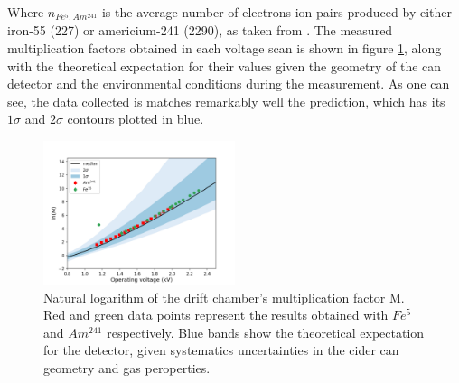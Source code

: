 Where $n_{Fe^{5},Am^{241}}$ is the average number of electrons-ion pairs produced by either iron-55 (227) or americium-241 (2290), as taken from \cite{can_paper}. The measured multiplication factors obtained in each voltage scan is shown in figure \ref{final_lnm}, along with the theoretical expectation for their values given the geometry of the can detector and the environmental conditions during the measurement. As one can see, the data collected is matches remarkably well the prediction, which has its $1\sigma$ and $2\sigma$ contours plotted in blue.

\begin{figure}[H]
  \includegraphics[width=0.5\textwidth]{graphics/lnM_final_plot.png}
  \caption{Natural logarithm of the drift chamber's multiplication factor M. Red and green data points represent the results obtained with $Fe^{5}$ and $Am^{241}$ respectively. Blue bands show the theoretical expectation for the detector, given systematics uncertainties in the cider can geometry and gas peroperties.}
  \label{final_lnm}
\end{figure}

